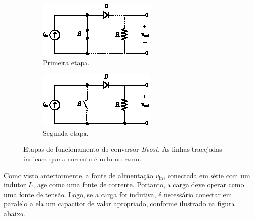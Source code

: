 \begin{figure}[h]
  \centering
  \captionsetup{justification=centering}
  \begin{subfigure}[b]{0.37\textwidth}
    \centering
    \includegraphics[width=\textwidth]{figuras/boost_converter_s1.eps}
    \caption{Primeira etapa.}
    \label{fig:boost_converter_s1}
  \end{subfigure}%
  \hfil
  \begin{subfigure}[b]{0.37\textwidth}
    \centering
    \includegraphics[width=\textwidth]{figuras/boost_converter_s2.eps}
    \caption{Segunda etapa.}
    \label{fig:boost_converter_s2}
  \end{subfigure}
  \caption{Etapas de funcionamento do conversor \textit{Boost}. As linhas tracejadas indicam que a corrente é nulo no ramo.}
\end{figure}

Como visto anteriormente, a fonte de alimentação $v_{\mathrm{in}}$, conectada em série com um indutor $L$, age como uma fonte de corrente. Portanto, a carga deve operar como uma fonte de tensão. Logo, se a carga for indutiva, é necessário conectar em paralelo a ela um capacitor de valor apropriado, conforme ilustrado na figura abaixo.


